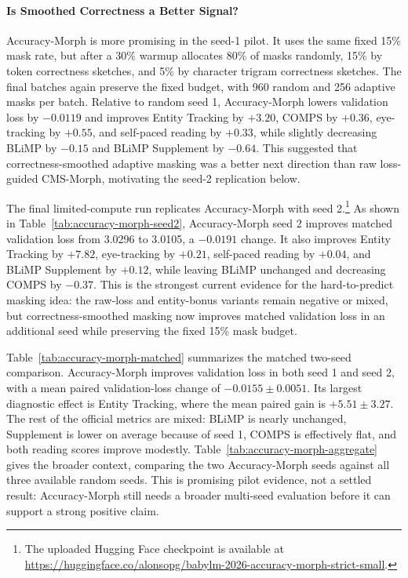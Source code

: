 \paragraph{Is Smoothed Correctness a Better Signal?}
Accuracy-Morph is more promising in the seed-1 pilot. It uses the same fixed 15\% mask rate, but after a 30\% warmup allocates 80\% of masks randomly, 15\% by token correctness sketches, and 5\% by character trigram correctness sketches. The final batches again preserve the fixed budget, with 960 random and 256 adaptive masks per batch. Relative to random seed 1, Accuracy-Morph lowers validation loss by $-0.0119$ and improves Entity Tracking by $+3.20$, COMPS by $+0.36$, eye-tracking by $+0.55$, and self-paced reading by $+0.33$, while slightly decreasing BLiMP by $-0.15$ and BLiMP Supplement by $-0.64$. This suggested that correctness-smoothed adaptive masking was a better next direction than raw loss-guided CMS-Morph, motivating the seed-2 replication below.

The final limited-compute run replicates Accuracy-Morph with seed 2.\footnote{The uploaded Hugging Face checkpoint is available at \url{https://huggingface.co/alonsopg/babylm-2026-accuracy-morph-strict-small}.} As shown in Table~\ref{tab:accuracy-morph-seed2}, Accuracy-Morph seed 2 improves matched validation loss from 3.0296 to 3.0105, a $-0.0191$ change. It also improves Entity Tracking by $+7.82$, eye-tracking by $+0.21$, self-paced reading by $+0.04$, and BLiMP Supplement by $+0.12$, while leaving BLiMP unchanged and decreasing COMPS by $-0.37$. This is the strongest current evidence for the hard-to-predict masking idea: the raw-loss and entity-bonus variants remain negative or mixed, but correctness-smoothed masking now improves matched validation loss in an additional seed while preserving the fixed 15\% mask budget.

Table~\ref{tab:accuracy-morph-matched} summarizes the matched two-seed comparison. Accuracy-Morph improves validation loss in both seed 1 and seed 2, with a mean paired validation-loss change of $-0.0155 \pm 0.0051$. Its largest diagnostic effect is Entity Tracking, where the mean paired gain is $+5.51 \pm 3.27$. The rest of the official metrics are mixed: BLiMP is nearly unchanged, Supplement is lower on average because of seed 1, COMPS is effectively flat, and both reading scores improve modestly. Table~\ref{tab:accuracy-morph-aggregate} gives the broader context, comparing the two Accuracy-Morph seeds against all three available random seeds. This is promising pilot evidence, not a settled result: Accuracy-Morph still needs a broader multi-seed evaluation before it can support a strong positive claim.

